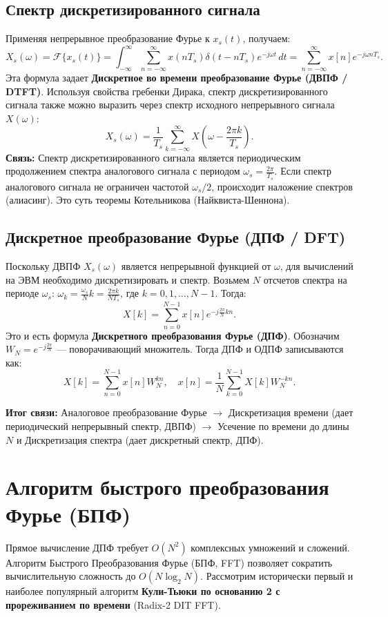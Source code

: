\documentclass[12pt,a4paper]{article}
\theoremstyle{definition}
\begin{document}
\subsection{Спектр дискретизированного сигнала}
Применяя непрерывное преобразование Фурье к $x_s(t)$, получаем:
$$ X_s(\omega) = \mathcal{F}\{x_s(t)\} = \int_{-\infty}^{\infty} \sum_{n=-\infty}^{\infty} x(nT_s) \delta(t - nT_s) e^{-j\omega t} \, dt = \sum_{n=-\infty}^{\infty} x[n] e^{-j\omega nT_s}. $$
Эта формула задает \textbf{Дискретное во времени преобразование Фурье (ДВПФ / DTFT)}.
Используя свойства гребенки Дирака, спектр дискретизированного сигнала также можно выразить через спектр исходного непрерывного сигнала $X(\omega)$:
$$ X_s(\omega) = \frac{1}{T_s} \sum_{k=-\infty}^{\infty} X\left(\omega - \frac{2\pi k}{T_s}\right). $$
\textbf{Связь:} Спектр дискретизированного сигнала является периодическим продолжением спектра аналогового сигнала с периодом $\omega_s = \frac{2\pi}{T_s}$. Если спектр аналогового сигнала не ограничен частотой $\omega_s/2$, происходит наложение спектров (алиасинг). Это суть теоремы Котельникова (Найквиста-Шеннона).

\subsection{Дискретное преобразование Фурье (ДПФ / DFT)}
Поскольку ДВПФ $X_s(\omega)$ является непрерывной функцией от $\omega$, для вычислений на ЭВМ необходимо дискретизировать и спектр. Возьмем $N$ отсчетов спектра на периоде $\omega_s$:
$\omega_k = \frac{\omega_s}{N} k = \frac{2\pi k}{N T_s}$, где $k = 0, 1, \dots, N-1$.
Тогда:
$$ X[k] = \sum_{n=0}^{N-1} x[n] e^{-j \frac{2\pi}{N} kn}. $$
Это и есть формула \textbf{Дискретного преобразования Фурье (ДПФ)}. Обозначим $W_N = e^{-j\frac{2\pi}{N}}$ — поворачивающий множитель.
Тогда ДПФ и ОДПФ записываются как:
$$ X[k] = \sum_{n=0}^{N-1} x[n] W_N^{kn}, \quad x[n] = \frac{1}{N} \sum_{k=0}^{N-1} X[k] W_N^{-kn}. $$

\textbf{Итог связи:} Аналоговое преобразование Фурье $\rightarrow$ Дискретизация времени (дает периодический непрерывный спектр, ДВПФ) $\rightarrow$ Усечение по времени до длины $N$ и Дискретизация спектра (дает дискретный спектр, ДПФ).

\section{Алгоритм быстрого преобразования Фурье (БПФ)}

Прямое вычисление ДПФ требует $O(N^2)$ комплексных умножений и сложений. Алгоритм Быстрого Преобразования Фурье (БПФ, FFT) позволяет сократить вычислительную сложность до $O(N \log_2 N)$. Рассмотрим исторически первый и наиболее популярный алгоритм \textbf{Кули-Тьюки по основанию 2 с прореживанием по времени} (Radix-2 DIT FFT).
\end{document}
